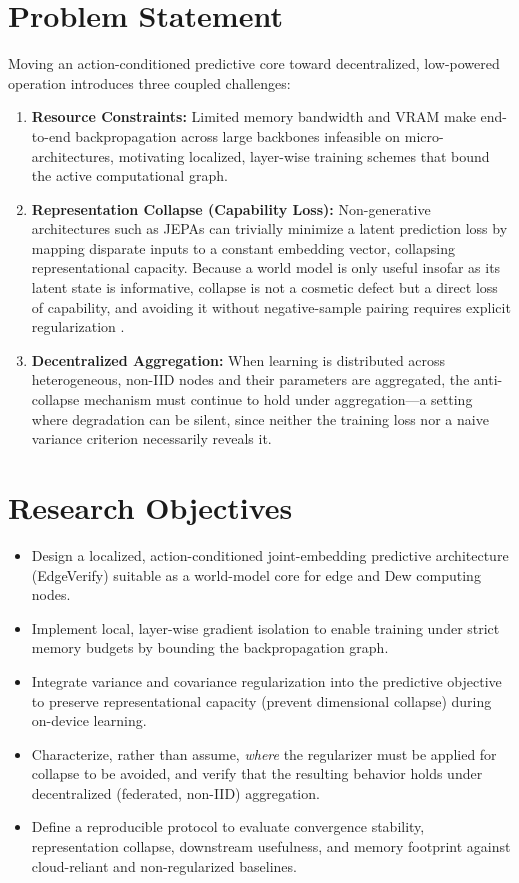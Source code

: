 \section{Problem Statement}
Moving an action-conditioned predictive core toward decentralized,
low-powered operation introduces three coupled challenges:
\begin{enumerate}
    \item \textbf{Resource Constraints:} Limited memory bandwidth and VRAM
    make end-to-end backpropagation across large backbones infeasible on
    micro-architectures, motivating localized, layer-wise training schemes
    that bound the active computational graph.
    \item \textbf{Representation Collapse (Capability Loss):}
    Non-generative architectures such as JEPAs can trivially minimize a
    latent prediction loss by mapping disparate inputs to a constant
    embedding vector, collapsing representational capacity. Because a world
    model is only useful insofar as its latent state is informative,
    collapse is not a cosmetic defect but a direct loss of capability, and
    avoiding it without negative-sample pairing requires explicit
    regularization \cite{bardes2022vicreg}.
    \item \textbf{Decentralized Aggregation:} When learning is distributed
    across heterogeneous, non-IID nodes and their parameters are aggregated,
    the anti-collapse mechanism must continue to hold under aggregation---a
    setting where degradation can be silent, since neither the training loss
    nor a naive variance criterion necessarily reveals it.
\end{enumerate}

\section{Research Objectives}
\begin{itemize}
    \item Design a localized, action-conditioned joint-embedding predictive
    architecture (EdgeVerify) suitable as a world-model core for edge and
    Dew computing nodes.
    \item Implement local, layer-wise gradient isolation to enable training
    under strict memory budgets by bounding the backpropagation graph.
    \item Integrate variance and covariance regularization into the
    predictive objective to preserve representational capacity (prevent
    dimensional collapse) during on-device learning.
    \item Characterize, rather than assume, \emph{where} the regularizer
    must be applied for collapse to be avoided, and verify that the
    resulting behavior holds under decentralized (federated, non-IID)
    aggregation.
    \item Define a reproducible protocol to evaluate convergence stability,
    representation collapse, downstream usefulness, and memory footprint
    against cloud-reliant and non-regularized baselines.
\end{itemize}

